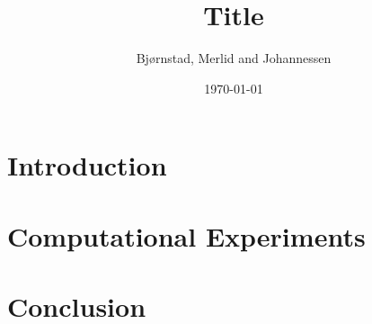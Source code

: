 \documentclass[aps,rmp,reprint,amsmath,amssymb,longbibliography,twocolumn,floatfix]{revtex4-1}
\begin{document}
\title{Title}

\author{Bjørnstad, Merlid and Johannessen}
\date{\today}


\begin{abstract}

\end{abstract}

\maketitle

\tableofcontents

\section{Introduction}
\label{sec:introduction}

\section{Computational Experiments}

\section{Conclusion}

\newpage

\appendix
\end{document}
